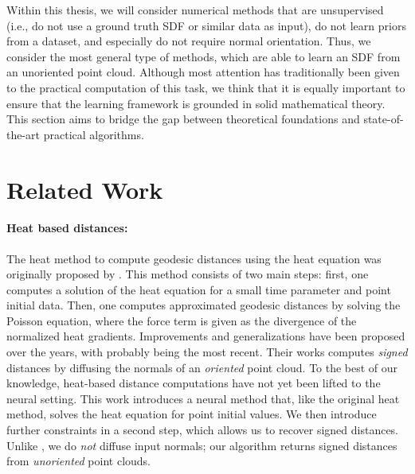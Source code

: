 \documentclass[12pt,openany]{book}
\theoremstyle{plainnormal}
\theoremstyle{remark}
\begin{document}
Within this thesis, we will consider numerical methods that are unsupervised (i.e., do not use a ground truth SDF or similar data as input), do not learn priors from a dataset, and especially do not require normal orientation. Thus, we consider the most general type of methods, which are able to learn an SDF from an unoriented point cloud. Although most attention has traditionally been given to the practical computation of this task, we think that it is equally important to ensure that the learning framework is grounded in solid mathematical theory. \\
This section aims to bridge the gap between theoretical foundations and state-of-the-art practical algorithms.
\section{Related Work} \label{SDF_rel_work}
\paragraph{Heat based distances:}
The heat method to compute geodesic distances using the heat equation was originally proposed by \cite{Crane_2013, Crane:2017:HMD}. This method consists of two main steps: first, one computes a solution of the heat equation for a small time parameter and point initial data. Then, one computes approximated geodesic distances by solving the Poisson equation, where the force term is given as the divergence of the normalized heat gradients. Improvements and generalizations have been proposed over the years, with \cite{FengCrane} probably being the most recent. Their works computes \emph{signed} distances by diffusing the normals of an \emph{oriented} point cloud. To the best of our knowledge, heat-based distance computations have not yet been lifted to the neural setting. This work introduces a neural method that, like the original heat method, solves the heat equation for point initial values. We then introduce further constraints in a second step, which allows us to recover signed distances. Unlike \cite{FengCrane}, we do \emph{not} diffuse input normals; our algorithm returns signed distances from \emph{unoriented} point clouds.
\end{document}

